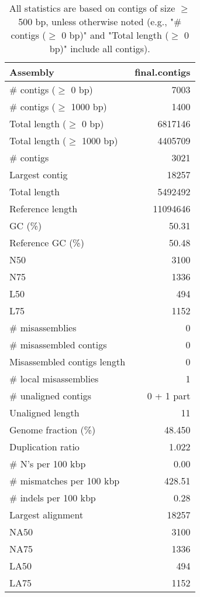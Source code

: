 \documentclass[12pt,a4paper]{article}
\begin{document}
\begin{table}[ht]
\begin{center}
\caption{All statistics are based on contigs of size $\geq$ 500 bp, unless otherwise noted (e.g., "\# contigs ($\geq$ 0 bp)" and "Total length ($\geq$ 0 bp)" include all contigs).}
\begin{tabular}{|l*{1}{|r}|}
\hline
Assembly & final.contigs \\ \hline
\# contigs ($\geq$ 0 bp) & 7003 \\ \hline
\# contigs ($\geq$ 1000 bp) & 1400 \\ \hline
Total length ($\geq$ 0 bp) & 6817146 \\ \hline
Total length ($\geq$ 1000 bp) & 4405709 \\ \hline
\# contigs & 3021 \\ \hline
Largest contig & 18257 \\ \hline
Total length & 5492492 \\ \hline
Reference length & 11094646 \\ \hline
GC (\%) & 50.31 \\ \hline
Reference GC (\%) & 50.48 \\ \hline
N50 & 3100 \\ \hline
N75 & 1336 \\ \hline
L50 & 494 \\ \hline
L75 & 1152 \\ \hline
\# misassemblies & 0 \\ \hline
\# misassembled contigs & 0 \\ \hline
Misassembled contigs length & 0 \\ \hline
\# local misassemblies & 1 \\ \hline
\# unaligned contigs & 0 + 1 part \\ \hline
Unaligned length & 11 \\ \hline
Genome fraction (\%) & 48.450 \\ \hline
Duplication ratio & 1.022 \\ \hline
\# N's per 100 kbp & 0.00 \\ \hline
\# mismatches per 100 kbp & 428.51 \\ \hline
\# indels per 100 kbp & 0.28 \\ \hline
Largest alignment & 18257 \\ \hline
NA50 & 3100 \\ \hline
NA75 & 1336 \\ \hline
LA50 & 494 \\ \hline
LA75 & 1152 \\ \hline
\end{tabular}
\end{center}
\end{table}
\end{document}
